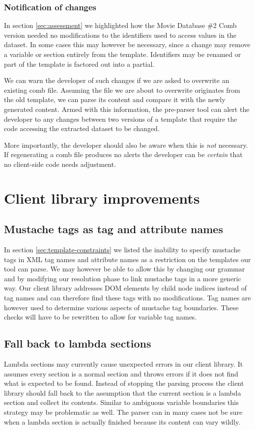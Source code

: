 \documentclass[thesis.tex]{subfiles}
\begin{document}
\subsubsection{Notification of changes}
In section \ref{sec:assessment} we highlighted how the Movie Database \#2 Comb
version needed no modifications to the identifiers used to access values in the
dataset.
In some cases this may however be necessary, since a change may remove
a variable or section entirely from the template. Identifiers may be renamed or
part of the template is factored out into a partial.

We can warn the developer of such changes if we are asked to overwrite an
existing comb file. Assuming the file we are about to overwrite originates from
the old template, we can parse its content and compare it with the newly
generated content. Armed with this information, the pre-parser tool can alert
the developer to any changes between two versions of a template that require the
code accessing the extracted dataset to be changed.

More importantly, the developer should also be aware when this is \emph{not}
necessary. If regenerating a comb file produces no alerts the developer can
be \emph{certain} that no client-side code needs adjustment.




\section{Client library improvements}

\subsection{Mustache tags as tag and attribute names}
In section \ref{sec:template-constraints} we listed the inability to specify
mustache tags in XML tag names and attribute names as a restriction on the
templates our tool can parse. We may however be able to allow this by changing
our grammar and by modifying our resolution phase to link mustache tags in a
more generic way.
Our client library addresses DOM elements by child node indices instead of tag
names and can therefore find these tags with no modifications. Tag names are
however used to determine various aspects of mustache tag boundaries. These
checks will have to be rewritten to allow for variable tag names.

\subsection{Fall back to lambda sections}
Lambda sections may currently cause unexpected errors in our client library.
It assumes every section is a normal section and throws errors if it does not
find what is expected to be found. Instead of stopping the parsing process
the client library should fall back to the assumption that the current section
is a lambda section and collect its contents. Similar to ambiguous variable
boundaries this strategy may be problematic as well. The parser can in many
cases not be sure when a lambda section is actually finished because its content
can vary wildly.
\end{document}

